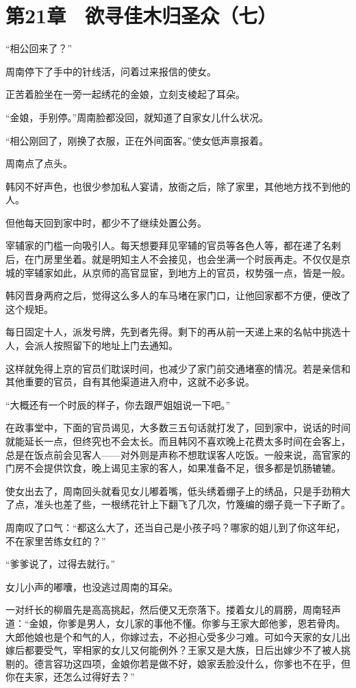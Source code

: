 \section{第21章　欲寻佳木归圣众（七）}

“相公回来了？”

周南停下了手中的针线活，问着过来报信的使女。

正苦着脸坐在一旁一起绣花的金娘，立刻支棱起了耳朵。

“金娘，手别停。”周南脸都没回，就知道了自家女儿什么状况。

“相公刚回了，刚换了衣服，正在外间面客。”使女低声禀报着。

周南点了点头。

韩冈不好声色，也很少参加私人宴请，放衙之后，除了家里，其他地方找不到他的人。

但他每天回到家中时，都少不了继续处置公务。

宰辅家的门槛一向吸引人。每天想要拜见宰辅的官员等各色人等，都在递了名剌后，在门房里坐着。就是明知主人不会接见，也会坐满一个时辰再走。不仅仅是京城的宰辅家如此，从京师的高官显宦，到地方上的官员，权势强一点，皆是一般。

韩冈晋身两府之后，觉得这么多人的车马堵在家门口，让他回家都不方便，便改了这个规矩。

每日固定十人，派发号牌，先到者先得。剩下的再从前一天递上来的名帖中挑选十人，会派人按照留下的地址上门去通知。

这样就免得上京的官员们耽误时间，也减少了家门前交通堵塞的情况。若是亲信和其他重要的官员，自有其他渠道进入府中，这就不必多说。

“大概还有一个时辰的样子，你去跟严姐姐说一下吧。”

在政事堂中，下面的官员谒见，大多数三五句话就打发了，回到家中，说话的时间就能延长一点，但终究也不会太长。而且韩冈不喜欢晚上花费太多时间在会客上，总是在饭点前会见客人——对外则是声称不想耽误客人吃饭。一般来说，高官家的门房不会提供饮食，晚上谒见主家的客人，如果准备不足，很多都是饥肠辘辘。

使女出去了，周南回头就看见女儿嘟着嘴，低头绣着绷子上的绣品，只是手劲稍大了点，准头也差了些，一根绣花针上下翻飞了几次，竹篾编的绷子竟一下子断了。

周南叹了口气：“都这么大了，还当自己是小孩子吗？哪家的姐儿到了你这年纪，不在家里苦练女红的？”

“爹爹说了，过得去就行。”

女儿小声的嘟囔，也没逃过周南的耳朵。

一对纤长的柳眉先是高高挑起，然后便又无奈落下。搂着女儿的肩膀，周南轻声道：“金娘，你爹是男人，女儿家的事他不懂。你爹与王家大郎他爹，恩若骨肉。大郎他娘也是个和气的人，你嫁过去，不必担心受多少刁难。可如今天家的女儿出嫁后都要受气，宰相家的女儿又何能例外？王家又是大族，日后出嫁少不了被人挑剔的。德言容功这四项，金娘你若是做不好，娘家丢脸没什么，你爹也不在乎，但你在夫家，还怎么过得好去？”

